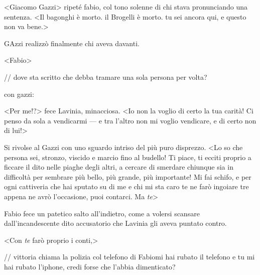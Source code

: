 <Giacomo Gazzi> ripeté fabio, col tono solenne di chi stava pronunciando una sentenza. <Il bagonghi è morto. il Brogelli è morto. tu sei ancora qui, e questo non va bene.> 

GAzzi realizzò finalmente chi aveva davanti.

<Fabio>






// dove sta scritto che debba tramare una sola persona per volta?

con gazzi:

<Per me!?> fece Lavinia, minacciosa.
<Io non la voglio di certo la tua carità! Ci penso da sola a
vendicarmi --- e tra l'altro non mi voglio vendicare, e di certo non di
lui!>

Si rivolse al Gazzi con uno sguardo intriso del più puro disprezzo.
<Lo so che persona sei, stronzo, viscido e marcio fino al
budello! Ti piace, ti ecciti proprio a ficcare il dito nelle piaghe
degli altri, a cercare di smerdare chiunque sia in difficoltà per
sembrare più bello, più grande, più importante! Mi fai schifo, e per
ogni cattiveria che hai sputato su di me e chi mi sta caro te ne farò
ingoiare tre appena ne avrò l'occasione, puoi contarci. Ma
\emph{te}>

Fabio fece un patetico salto all'indietro, come a volersi scansare
dall'incandescente dito accusatorio che Lavinia gli aveva puntato
contro.

<Con \emph{te} farò proprio i conti,>


// vittoria chiama la polizia col telefono di Fabiomi hai rubato il telefono
e tu mi hai rubato l'iphone, credi forse che l'abbia dimenticato?
